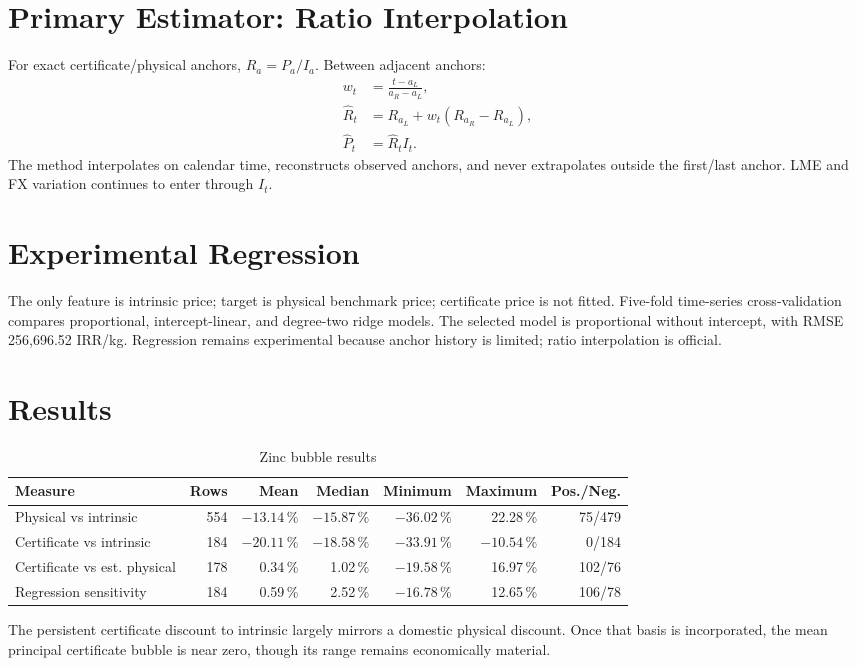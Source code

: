 \documentclass[11pt,a4paper]{article}
\newcommand{\pct}{\,\%}\newcommand{\code}[1]{\texttt{#1}}
\begin{document}
\section{Primary Estimator: Ratio Interpolation}
For exact certificate/physical anchors, $R_a=P_a/I_a$. Between adjacent anchors:
\begin{align}
w_t&=\frac{t-a_L}{a_R-a_L},\\
\widehat{R}_t&=R_{a_L}+w_t(R_{a_R}-R_{a_L}),\\
\widehat{P}_t&=\widehat{R}_t I_t.
\end{align}
The method interpolates on calendar time, reconstructs observed anchors, and never extrapolates
outside the first/last anchor. LME and FX variation continues to enter through $I_t$.

\section{Experimental Regression}
The only feature is intrinsic price; target is physical benchmark price; certificate price is
not fitted. Five-fold time-series cross-validation compares proportional, intercept-linear, and
degree-two ridge models. The selected model is proportional without intercept, with RMSE
256,696.52 IRR/kg. Regression remains experimental because anchor history is limited; ratio
interpolation is official.

\section{Results}
\begin{table}[h]\centering
\begin{tabular}{lrrrrrr}\toprule
Measure&Rows&Mean&Median&Minimum&Maximum&Pos./Neg.\\\midrule
Physical vs intrinsic&554&$-13.14\pct$&$-15.87\pct$&$-36.02\pct$&22.28\pct&75/479\\
Certificate vs intrinsic&184&$-20.11\pct$&$-18.58\pct$&$-33.91\pct$&$-10.54\pct$&0/184\\
Certificate vs est. physical&178&0.34\pct&1.02\pct&$-19.58\pct$&16.97\pct&102/76\\
Regression sensitivity&184&0.59\pct&2.52\pct&$-16.78\pct$&12.65\pct&106/78\\\bottomrule
\end{tabular}\caption{Zinc bubble results}\end{table}

The persistent certificate discount to intrinsic largely mirrors a domestic physical discount.
Once that basis is incorporated, the mean principal certificate bubble is near zero, though its
range remains economically material.
\end{document}
